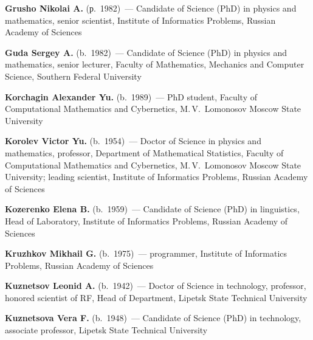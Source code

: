 \begin{multicols}{2}
 

\noindent
\textbf{Grusho Nikolai A.} (р.\ 1982)~--- Candidate of Science (PhD) in physics and mathematics, 
senior scientist, Institute of Informatics Problems, Russian Academy of Sciences

\vspace*{4pt}

\noindent
\textbf{Guda Sergey A.} (b.\ 1982)~--- Candidate of Science (PhD) in physics and mathematics, 
senior lecturer, Faculty of Mathematics, Mechanics and Computer Science, Southern Federal 
University

\vspace*{4pt}

\noindent
\textbf{Korchagin Alexander Yu.} (b.\ 1989)~--- PhD student, Faculty
of Computational Mathematics and Cybernetics, M.\,V.~Lomonosov Moscow State University

\vspace*{4pt}

\noindent
\textbf{Korolev Victor Yu.} (b.\ 1954)~--- Doctor of Science in physics and mathematics, 
professor, Department of Mathematical Statistics, Faculty of Computational Mathematics 
and Cybernetics, M.\,V.~Lomonosov Moscow State University; 
leading scientist, Institute of Informatics Problems, Russian Academy of Sciences

\columnbreak

\noindent
\textbf{Kozerenko Elena B.} (b.\ 1959)~--- Candidate of Science (PhD) in linguistics, 
Head of Laboratory, Institute of Informatics Problems, Russian Academy of Sciences

\vspace*{4pt}

\noindent
\textbf{Kruzhkov Mikhail G.} (b.\ 1975)~--- programmer, Institute of Informatics Problems, 
Russian Academy of Sciences

\vspace*{4pt}

\noindent
\textbf{Kuznetsov Leonid A.} (b.\ 1942)~--- Doctor of Science in technology, professor, 
honored scientist of RF, Head of Department, Lipetsk State Technical University

\vspace*{4pt}

\noindent
\textbf{Kuznetsova  Vera F.} (b.\ 1948)~--- Candidate of Science (PhD) in technology, 
associate professor, Lipetsk State Technical University

\vspace*{4pt}


\end{multicols}
